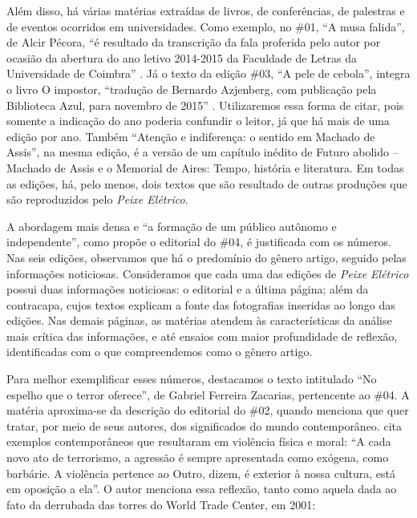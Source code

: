 \documentclass[portuguese]{textolivre}
\begin{document}
Além disso, há várias matérias extraídas de livros, de conferências, de palestras e de eventos ocorridos em universidades. Como exemplo, no \#01, “A musa falida”, de Alcir Pécora, “é resultado da transcrição da fala proferida pelo autor por ocasião da abertura do ano letivo 2014-2015 da Faculdade de Letras da Universidade de Coimbra” \cite[n.1, p. 107]{pecora2015musa}. Já o texto da edição \#03, “A pele de cebola”, integra o livro O impostor, “tradução de Bernardo Azjenberg, com publicação pela Biblioteca Azul, para novembro de 2015” \cite[n. 3, s/p]{cercas2015pele}. Utilizaremos essa forma de citar, pois somente a indicação do ano poderia confundir o leitor, já que há mais de uma edição por ano. Também “Atenção e indiferença: o sentido em Machado de Assis”, na mesma edição, é a versão de um capítulo inédito de Futuro abolido – Machado de Assis e o Memorial de Aires: Tempo, história e literatura. Em todas as edições, há, pelo menos, dois textos que são resultado de outras produções que são reproduzidos pelo \textit{Peixe Elétrico}.

A abordagem mais densa e “a formação de um público autônomo e independente”, como propõe o editorial do \#04, é justificada com os números. Nas seis edições, observamos que há o predomínio do gênero artigo, seguido pelas informações noticiosas. Consideramos que cada uma das edições de \textit{Peixe Elétrico} possui duas informações noticiosas: o editorial e a última página; além da contracapa, cujos textos explicam a fonte das fotografias inseridas ao longo das edições. Nas demais páginas, as matérias atendem às características da análise mais crítica das informações, e até ensaios com maior profundidade de reflexão, identificadas com o que compreendemos como o gênero artigo.

Para melhor exemplificar esses números, destacamos o texto intitulado “No espelho que o terror oferece”, de Gabriel Ferreira Zacarias, pertencente ao \#04. A matéria aproxima-se da descrição do editorial do \#02, quando menciona que quer tratar, por meio de seus autores, dos significados do mundo contemporâneo. \textcite[n. 4, s/p]{zacarias2016terror} cita exemplos contemporâneos que resultaram em violência física e moral: “A cada novo ato de terrorismo, a agressão é sempre apresentada como exógena, como barbárie. A violência pertence ao Outro, dizem, é exterior à nossa cultura, está em oposição a ela”. O autor menciona essa reflexão, tanto como aquela dada ao fato da derrubada das torres do World Trade Center, em 2001:
\end{document}

